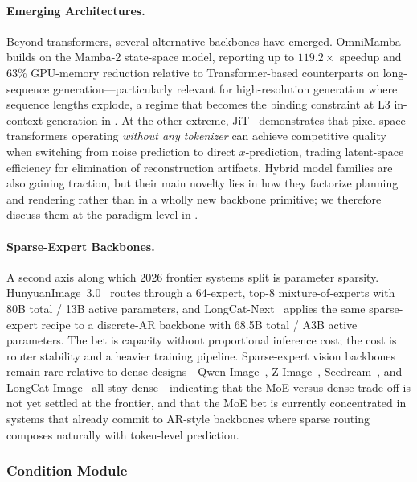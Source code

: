 \paragraph{Emerging Architectures.}
Beyond transformers, several alternative backbones have emerged. OmniMamba~\citep{zou2025omnimamba} builds on the Mamba-2 state-space model, reporting up to $119.2\times$ speedup and $63\%$ GPU-memory reduction relative to Transformer-based counterparts on long-sequence generation---particularly relevant for high-resolution generation where sequence lengths explode, a regime that becomes the binding constraint at L3 in-context generation in . At the other extreme, JiT~\citep{li2025back} demonstrates that pixel-space transformers operating \emph{without any tokenizer} can achieve competitive quality when switching from noise prediction to direct $x$-prediction, trading latent-space efficiency for elimination of reconstruction artifacts. Hybrid model families are also gaining traction, but their main novelty lies in how they factorize planning and rendering rather than in a wholly new backbone primitive; we therefore discuss them at the paradigm level in .

\paragraph{Sparse-Expert Backbones.}
A second axis along which 2026 frontier systems split is parameter sparsity. HunyuanImage~3.0~\citep{cao2025hunyuanimage} routes through a 64-expert, top-8 mixture-of-experts with 80B total / 13B active parameters, and LongCat-Next~\citep{team2026longcat} applies the same sparse-expert recipe to a discrete-AR backbone with 68.5B total / A3B active parameters. The bet is capacity without proportional inference cost; the cost is router stability and a heavier training pipeline. Sparse-expert vision backbones remain rare relative to dense designs---Qwen-Image~\citep{wu2025qwen}, Z-Image~\citep{cai2025z}, Seedream~\citep{seedream2025seedream}, and LongCat-Image~\citep{team2025longcat} all stay dense---indicating that the MoE-versus-dense trade-off is not yet settled at the frontier, and that the MoE bet is currently concentrated in systems that already commit to AR-style backbones where sparse routing composes naturally with token-level prediction.


\subsubsection{Condition Module}
\label{sec:arch_condition}


